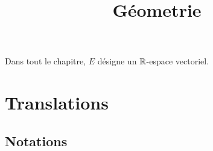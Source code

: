 

\title{Géometrie}



\maketitle
\pagebreak
\tableofcontents

Dans tout le chapitre, $E$ désigne un $\mathbb{R}$-espace vectoriel.

\section{Translations}

\subsection{Notations}

